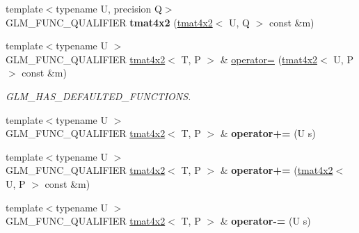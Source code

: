 \begin{DoxyCompactItemize}
\item 
\mbox{\label{structglm_1_1tmat4x2_a08e86729278cf333bbde38195810311b}} 
{\footnotesize template$<$typename U, precision Q$>$ }\\G\+L\+M\+\_\+\+F\+U\+N\+C\+\_\+\+Q\+U\+A\+L\+I\+F\+I\+ER {\bfseries tmat4x2} (\hyperlink{structglm_1_1tmat4x2}{tmat4x2}$<$ U, Q $>$ const \&m)
\item 
\mbox{\label{structglm_1_1tmat4x2_ac513919fdc4d1506721e4e6bf78556a7}} 
{\footnotesize template$<$typename U $>$ }\\G\+L\+M\+\_\+\+F\+U\+N\+C\+\_\+\+Q\+U\+A\+L\+I\+F\+I\+ER \hyperlink{structglm_1_1tmat4x2}{tmat4x2}$<$ T, P $>$ \& \hyperlink{structglm_1_1tmat4x2_ac513919fdc4d1506721e4e6bf78556a7}{operator=} (\hyperlink{structglm_1_1tmat4x2}{tmat4x2}$<$ U, P $>$ const \&m)
\begin{DoxyCompactList}\small\item\em G\+L\+M\+\_\+\+H\+A\+S\+\_\+\+D\+E\+F\+A\+U\+L\+T\+E\+D\+\_\+\+F\+U\+N\+C\+T\+I\+O\+NS. \end{DoxyCompactList}\item 
\mbox{\label{structglm_1_1tmat4x2_abf01335ab1627fdec0cdeabcc1779d6d}} 
{\footnotesize template$<$typename U $>$ }\\G\+L\+M\+\_\+\+F\+U\+N\+C\+\_\+\+Q\+U\+A\+L\+I\+F\+I\+ER \hyperlink{structglm_1_1tmat4x2}{tmat4x2}$<$ T, P $>$ \& {\bfseries operator+=} (U s)
\item 
\mbox{\label{structglm_1_1tmat4x2_ad0563b333d9ef8633dc748b58352fdee}} 
{\footnotesize template$<$typename U $>$ }\\G\+L\+M\+\_\+\+F\+U\+N\+C\+\_\+\+Q\+U\+A\+L\+I\+F\+I\+ER \hyperlink{structglm_1_1tmat4x2}{tmat4x2}$<$ T, P $>$ \& {\bfseries operator+=} (\hyperlink{structglm_1_1tmat4x2}{tmat4x2}$<$ U, P $>$ const \&m)
\item 
\mbox{\label{structglm_1_1tmat4x2_ae2ad696a80928bd3ba571e8e65b196fb}} 
{\footnotesize template$<$typename U $>$ }\\G\+L\+M\+\_\+\+F\+U\+N\+C\+\_\+\+Q\+U\+A\+L\+I\+F\+I\+ER \hyperlink{structglm_1_1tmat4x2}{tmat4x2}$<$ T, P $>$ \& {\bfseries operator-\/=} (U s)
\item 
\mbox{\label{structglm_1_1tmat4x2_a543c1cb13551ba460439f6546e813c4c}} 

\end{DoxyCompactItemize}
